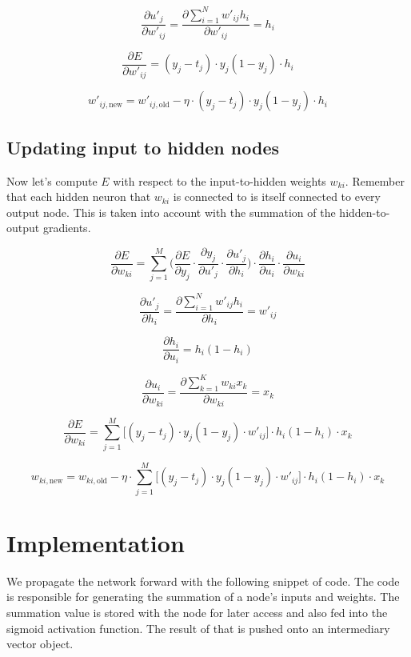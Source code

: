 \documentclass[11pt]{article}
\begin{document}
\[
\frac{\partial u'_j}{\partial w'_{ij}} = \frac{\partial \sum\limits_{i=1}^{N} w'_{ij}h_i}{\partial w'_{ij}} = h_i
\]

\[
\frac{\partial E}{\partial w'_{ij}} = (y_j - t_j) \cdot y_j(1-y_j) \cdot h_i
\]

\[
w'_{ij,\text{new}} = w'_{ij,\text{old}} - \eta \cdot (y_j - t_j) \cdot y_j(1-y_j) \cdot h_i
\]

\subsection{Updating input to hidden nodes}
\label{sec:orgheadline2}

Now let's compute \(E\) with respect to the input-to-hidden weights \(w_{ki}\). Remember that each hidden neuron that \(w_{ki}\) is connected to is itself connected to every output node. This is taken into account with the summation of the hidden-to-output gradients.

\[
\frac{\partial E}{\partial w_{ki}} = \sum\limits_{j=1}^{M}\bigg(
\frac{\partial E}{\partial y_j} \cdot
\frac{\partial y_j}{\partial u'_j} \cdot
\frac{\partial u'_j}{\partial h_i}
\bigg) \cdot
\frac{\partial h_i}{\partial u_i} \cdot
\frac{\partial u_i}{\partial w_{ki}}
\]

\[
\frac{\partial u'_j}{\partial h_i} = \frac{\partial \sum\limits_{i = 1}^{N}w'_{ij}h_i}{\partial h_i} = w'_{ij}
\]

\[
\frac{\partial h_i}{\partial u_i} = h_i(1-h_i)
\]

\[
\frac{\partial u_i}{\partial w_{ki}} = \frac{\partial \sum\limits_{k=1}^{K}w_{ki}x_k}{\partial w_{ki}} = x_k
\]

\[
\frac{\partial E}{\partial w_{ki}} = \sum\limits_{j=1}^{M}\bigg[
(y_j - t_j) \cdot
y_j(1-y_j) \cdot
w'_{ij}
\bigg] \cdot
h_i(1-h_i) \cdot
x_k
\]

\[
w_{ki,\text{new}} = w_{ki,\text{old}} - \eta \cdot \sum\limits_{j=1}^{M}\bigg[
(y_j - t_j) \cdot
y_j(1-y_j) \cdot
w'_{ij}
\bigg] \cdot
h_i(1-h_i) \cdot
x_k
\]
\section{Implementation}
\label{sec:orgheadline4}

We propagate the network forward with the following snippet of code. The code is responsible for generating the summation of a node's inputs and weights. The summation value is stored with the node for later access and also fed into the sigmoid activation function. The result of that is pushed onto an intermediary vector object.
\end{document}

